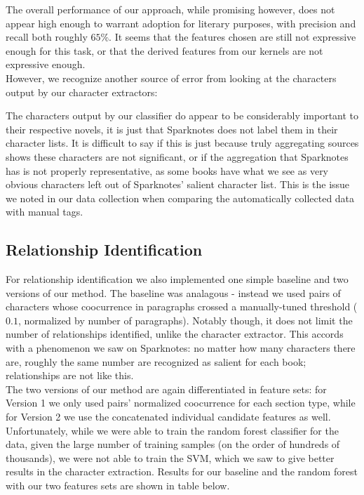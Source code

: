 \documentclass[12pt]{article}
\begin{document}
        The overall performance of our approach, while promising however, does not appear high enough to warrant
        adoption for literary purposes, with precision and recall both roughly $65\%$. It seems 
        that the features chosen are still not expressive enough for this task, or that the derived features
        from our kernels are not expressive enough. \\

        However, we recognize another source of error from looking at the characters output by our
        character extractors:
    

        The characters output by our classifier do appear to be considerably important to their
        respective novels, it is just that Sparknotes does not label them in their character lists.
        It is difficult to say if this is just because truly aggregating sources shows these
        characters are not significant, or if the aggregation that Sparknotes has is not properly
        representative, as some books have what we see as very obvious characters left
        out of Sparknotes' salient character list. This is the issue we noted in our data
        collection when comparing the automatically collected data with manual tags. 

    \subsection{Relationship Identification}

        For relationship identification we also implemented one simple baseline and two versions of our method.
        The baseline was analagous - instead we used pairs of characters whose coocurrence in paragraphs crossed 
        a manually-tuned threshold ($0.1$, normalized by number of paragraphs). Notably though, it does not
        limit the number of relationships identified, unlike the character extractor. This accords with a
        phenomenon we saw on Sparknotes: no matter how many characters there are, roughly the same number
        are recognized as salient for each book; relationships are not like this. \\

        The two versions of our method are again differentiated in feature sets: for Version 1 we only used
        pairs' normalized coocurrence for each section type, while for Version 2 we use the concatenated
        individual candidate features as well. Unfortunately, while we were able to train the random
        forest classifier for the data, given the large number of training samples (on the order of hundreds
        of thousands), we were not able to train the SVM, which we saw to give better results
        in the character extraction. Results for our baseline and the random forest with our two
        features sets are shown in table below.
\end{document}
